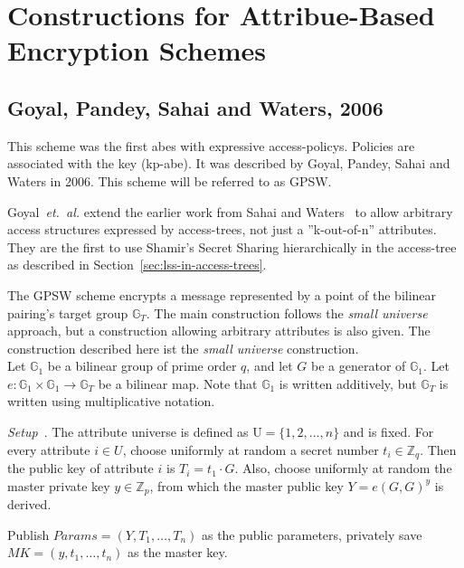 \chapter{Constructions for Attribue-Based Encryption Schemes}\label{sec:concrete-schemes} 

\section{Goyal, Pandey, Sahai and Waters, 2006}
This scheme was the first \acrshort{abes} with expressive \glspl{access-policy}. Policies are associated with the key (\acrshort{kp-abe}).
It was described by Goyal, Pandey, Sahai and Waters \cite{goyal_attribute-based_2006} in 2006. This scheme will be referred to as GPSW.

Goyal~\emph{et.~al.} extend the earlier work from Sahai and Waters~\cite{sahai_fuzzy_2005} to allow arbitrary access structures expressed by \glspl{access-tree}, not just a ''k-out-of-n'' attributes.
They are the first to use Shamir's Secret Sharing hierarchically in the \gls{access-tree} as described in Section~\ref{sec:lss-in-access-trees}. 

The GPSW scheme encrypts a message represented by a point of the bilinear pairing's target group $\mathbb{G}_T$.
The main construction follows the \emph{small universe} approach, but a construction allowing arbitrary attributes is also given.
The construction described here ist the \emph{small universe} construction.\\

Let $\mathbb{G}_1$ be a bilinear group of prime order $q$, and let $G$ be a generator of $\mathbb{G}_1$. Let $e: \mathbb{G}_1 \times \mathbb{G}_1 \rightarrow \mathbb{G}_T$ be a bilinear map.
Note that $\mathbb{G}_1$ is written additively, but $\mathbb{G}_T$ is written using multiplicative notation.

\emph{Setup}~\cite{goyal_attribute-based_2006}.
The attribute universe is defined as $\text{U} = \{1, 2, \dots, n\}$ and is fixed.
For every attribute $i \in U$, choose uniformly at random a secret number $t_i \in \mathbb{Z}_q$.
Then the public key of attribute $i$ is $T_i = t_1 \cdot G$.
Also, choose uniformly at random the master private key $y \in \mathbb{Z}_p$, from which the master public key $Y = e(G, G)^y$ is derived.

Publish $Params=(Y, T_1, \dots, T_n)$ as the public parameters, privately save $MK = (y, t_1, \dots, t_n)$ as the master key.
\\


